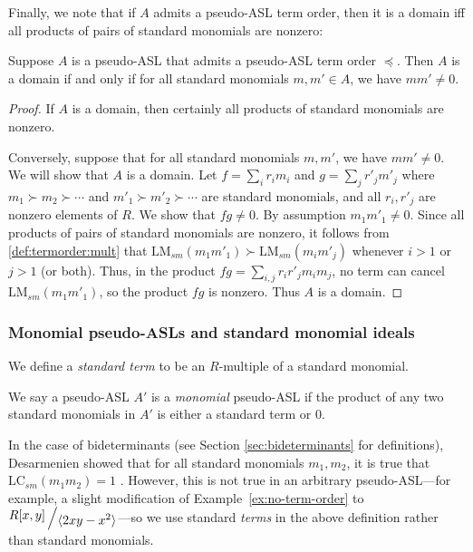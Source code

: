 \documentclass[11pt,reqno]{amsart}
\newcommand{\bigslant}[2]{{\raisebox{.2em}{$#1$}\left/\raisebox{-.2em}{$#2$}\right.}}
\newcommand{\lmsm}{\text{LM}_{sm}}
\newcommand{\lcsm}{\text{LC}_{sm}}
\theoremstyle{definition}
\numberwithin{equation}{section}
\begin{document}
Finally, we note that if $A$ admits a pseudo-ASL term order, then it is a domain iff all products of pairs of standard monomials are nonzero:

\begin{proposition} \label{prop:domain}
Suppose $A$ is a pseudo-ASL that admits a pseudo-ASL term order $\preceq$. Then $A$ is a domain if and only if for all standard monomials $m,m' \in A$, we have $mm' \neq 0$.
\end{proposition}

\begin{proof}
If $A$ is a domain, then certainly all products of standard monomials are nonzero.

Conversely, suppose that for all standard monomials $m,m'$, we have $mm' \neq 0$. We will show that $A$ is a domain. Let $f = \sum_i r_i m_i$ and $g = \sum_j r'_j m'_j$ where $m_1 \succ m_2 \succ \dotsb$ and $m'_1 \succ m'_2 \succ \dotsb$ are standard monomials, and all $r_i,r'_j$ are nonzero elements of $R$. We show that $fg \neq 0$. By assumption $m_1 m'_1 \neq 0$. Since all products of pairs of standard monomials are nonzero, it follows from \ref{def:termorder:mult} that $\lmsm(m_1 m'_1) \succ \lmsm(m_i m'_j)$ whenever $i > 1$ or $j > 1$ (or both). Thus, in the product $fg = \sum_{i,j} r_i r'_j m_i m_j$, no term can cancel $\lmsm(m_1 m'_1)$, so the product $fg$ is nonzero. Thus $A$ is a domain.
\end{proof}

\subsubsection{Monomial pseudo-ASLs and standard monomial ideals} \label{sec:monomial}

We define a \emph{standard term} to be an $R$-multiple of a standard monomial. 

\begin{definition}[store=defn-monomial-asl, note={Monomial pseudo-ASL}]
We say a pseudo-ASL $A'$ is a \emph{monomial} pseudo-ASL if the product of any two standard monomials in $A'$ is either a standard term or 0.
\end{definition}

\begin{remark}
In the case of bideterminants (see Section \ref{sec:bideterminants} for definitions), Desarmenien showed that for all standard monomials $m_1, m_2$, it is true that $\lcsm(m_1 m_2) = 1$  \cite{desarmenien1980algorithm}. However, this is not true in an arbitrary pseudo-ASL---for example, a slight modification of Example~\ref{ex:no-term-order} to $\bigslant{R[x,y]}{\langle 2xy - x^2 \rangle}$---so we use standard \emph{terms} in the above definition rather than standard monomials.
\end{remark}
\end{document}
